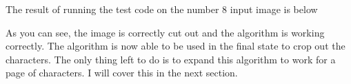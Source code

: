 \documentclass{report}
\begin{document}
The result of running the test code on the number 8 input image is below
\begin{figure}[H]
    \centering
    \label{fig:final test}
\end{figure}
\noindent As you can see, the image is correctly cut out and the algorithm is working correctly. The algorithm is now able to be used in the final state to crop out the characters. The only thing left to do is to expand this algorithm to work for a page of characters. I will cover this in the next section.
\newpage
\end{document}
